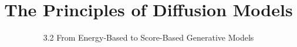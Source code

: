 ﻿%

\graphicspath{{../images/}}
\title{The Principles of Diffusion Models}
\subtitle{3.2 From Energy-Based to Score-Based Generative Models}


\begin{frame}
    \titlepage
\end{frame}


